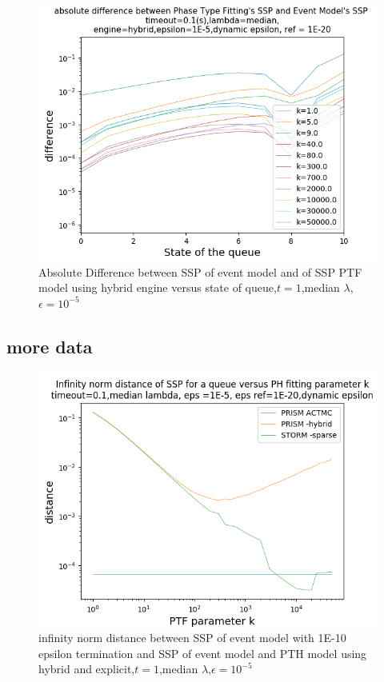 \documentclass[paper=a4, fontsize=11pt]{scrartcl}
\numberwithin{equation}{section}		%
\numberwithin{figure}{section}			%
\numberwithin{table}{section}				%
\begin{document}
\begin{figure}
	\centering
	\includegraphics[width=17cm]{picture/New_model/1E-5/diff_hybrid_dynamic.png}
	\caption{Absolute Difference between SSP of event model and of SSP PTF model using hybrid engine versus state of queue,$t=1$,median $\lambda$,$\epsilon=10^{-5}$}
	\label{fig:dist_dynamic_hybrid}
\end{figure}

\subsection{more data}
\begin{figure}
	\centering
	\includegraphics[width=17cm]{picture/New_model/1E-5/distance_dynamic_1E-5.png}
	\caption{infinity norm distance between SSP of event model with 1E-10 epsilon termination and SSP of event model and PTH model using hybrid and explicit,$t=1$,median $\lambda$,$\epsilon=10^{-5}$}
	\label{fig:dist_versus_k}
\end{figure}
\end{document}
